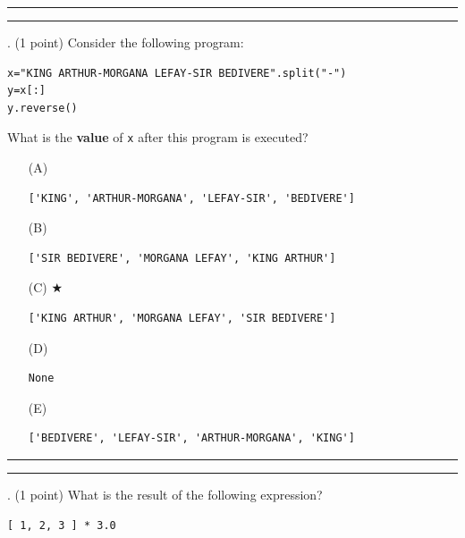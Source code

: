 \documentclass{article}
\begin{document}
\vspace*{2em}
\hrule
\vspace{2em}

\vspace{2em}
\hrule height 2pt


\newpage
{}. (1 point)
Consider the following program:
\begin{verbatim}
x="KING ARTHUR-MORGANA LEFAY-SIR BEDIVERE".split("-")
y=x[:]
y.reverse()
\end{verbatim}
What is the \textbf{value} of \texttt{x} after this program is executed?


\begin{enumerate}
\item[(A)]
\begin{verbatim}['KING', 'ARTHUR-MORGANA', 'LEFAY-SIR', 'BEDIVERE']\end{verbatim}

\item[(B)]
\begin{verbatim}['SIR BEDIVERE', 'MORGANA LEFAY', 'KING ARTHUR']\end{verbatim}

\item[(C)] $\bigstar$ 
\begin{verbatim}['KING ARTHUR', 'MORGANA LEFAY', 'SIR BEDIVERE']\end{verbatim}

\item[(D)]
\begin{verbatim}None\end{verbatim}

\item[(E)]
\begin{verbatim}['BEDIVERE', 'LEFAY-SIR', 'ARTHUR-MORGANA', 'KING']\end{verbatim}

\end{enumerate}

\vspace*{2em}
\hrule
\vspace{2em}

\vspace{2em}
\hrule height 2pt


\newpage
{}. (1 point)
What is the result of the following expression?
\begin{verbatim}
[ 1, 2, 3 ] * 3.0
\end{verbatim}
\end{document}
